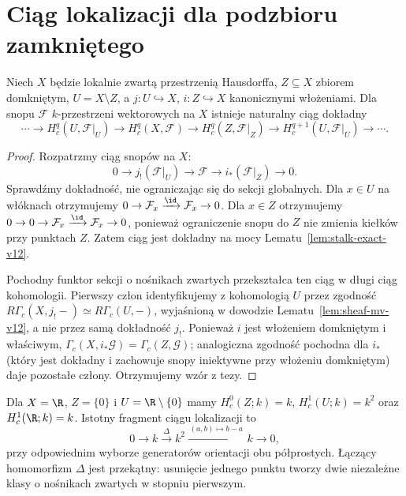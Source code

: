 \section{Ciąg lokalizacji dla podzbioru zamkniętego}
\begin{twierdzenie}
\label{thm:localization-v12}
Niech $X$ będzie lokalnie zwartą przestrzenią Hausdorffa,
$Z\subseteq X$ zbiorem domkniętym, $U=X\setminus Z$,
a $j:U\hookrightarrow X$, $i:Z\hookrightarrow X$
kanonicznymi włożeniami. Dla snopu $\mathcal F$
$k$-przestrzeni wektorowych na $X$ istnieje naturalny
ciąg dokładny
\[
\cdots\to H_c^q(U,\mathcal F|_U)\to H_c^q(X,\mathcal F)
\to H_c^q(Z,\mathcal F|_Z)
\to H_c^{q+1}(U,\mathcal F|_U)\to\cdots.
\]
\end{twierdzenie}
\begin{proof}
Rozpatrzmy ciąg snopów na $X$:
\[
0\longrightarrow j_!(\mathcal F|_U)
\longrightarrow\mathcal F\longrightarrow i_*(\mathcal F|_Z)
\longrightarrow0.
\]
Sprawdźmy dokładność, nie ograniczając się do sekcji globalnych.
Dla $x\in U$ na włóknach otrzymujemy
$0\to\mathcal F_x\xrightarrow{\id}\mathcal F_x\to0$.
Dla $x\in Z$ otrzymujemy
$0\to0\to\mathcal F_x\xrightarrow{\id}\mathcal F_x\to0$,
ponieważ ograniczenie snopu do $Z$ nie zmienia
kiełków przy punktach $Z$. Zatem ciąg jest dokładny
na mocy Lematu~\ref{lem:stalk-exact-v12}.

Pochodny funktor sekcji o nośnikach zwartych
przekształca ten ciąg w długi ciąg kohomologii.
Pierwszy człon identyfikujemy z kohomologią $U$
przez zgodność $R\Gamma_c(X,j_!{-})\simeq
R\Gamma_c(U,{-})$, wyjaśnioną w dowodzie
Lematu~\ref{lem:sheaf-mv-v12}, a nie przez samą
dokładność $j_!$.
Ponieważ $i$ jest włożeniem domkniętym i właściwym,
$\Gamma_c(X,i_*\mathcal G)=\Gamma_c(Z,\mathcal G)$;
analogiczna zgodność pochodna dla $i_*$
(który jest dokładny i zachowuje snopy iniektywne
przy włożeniu domkniętym) daje pozostałe człony.
Otrzymujemy wzór z tezy.
\end{proof}

\begin{przyklad}
Dla $X=\R$, $Z=\{0\}$ i $U=\R\setminus\{0\}$ mamy
$H_c^0(Z;k)=k$, $H_c^1(U;k)=k^2$ oraz
$H_c^1(\R;k)=k$. Istotny fragment ciągu lokalizacji to
\[
0\longrightarrow k\xrightarrow{\Delta}k^2
\xrightarrow{\,(a,b)\mapsto b-a\,}k\longrightarrow0,
\]
przy odpowiednim wyborze generatorów orientacji
obu półprostych. Łączący homomorfizm $\Delta$
jest przekątny: usunięcie jednego punktu tworzy dwie
niezależne klasy o nośnikach zwartych w stopniu pierwszym.
\end{przyklad}

